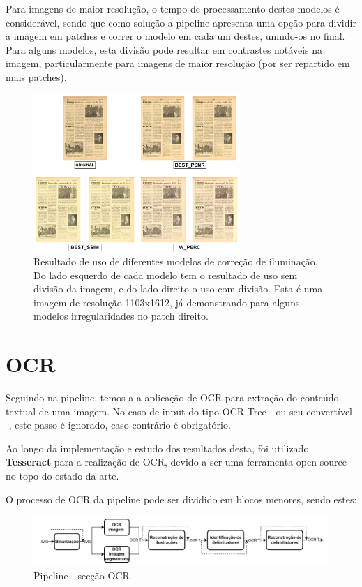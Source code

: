 Para imagens de maior resolução, o tempo de processamento destes modelos é considerável, sendo que como solução a pipeline apresenta uma opção para dividir a imagem em patches e correr o modelo em cada um destes, unindo-os no final. Para alguns modelos, esta divisão pode resultar em contrastes notáveis na imagem, particularmente para imagens de maior resolução (por ser repartido em mais patches).

\begin{figure}[H]
	\centering
	\includegraphics[width=0.7\textwidth]{images/ilustracoes/fix_illumination_example.png}
	\caption{Resultado de uso de diferentes modelos de correção de iluminação. Do lado esquerdo de cada modelo tem o resultado de uso sem divisão da imagem, e do lado direito o uso com divisão. Esta é uma imagem de resolução 1103x1612, já demonstrando para alguns modelos irregularidades no patch direito.}
	\label{fig:fix_illumination_example}
\end{figure}


\section{OCR}


Seguindo na pipeline, temos a a aplicação de OCR para extração do conteúdo textual de uma imagem. No caso de input do tipo OCR Tree - ou seu convertível -, este passo é ignorado, caso contrário é obrigatório.


Ao longo da implementação e estudo dos resultados desta, foi utilizado \textbf{Tesseract} para a realização de OCR, devido a ser uma ferramenta open-source no topo do estado da arte.

O processo de OCR da pipeline pode ser dividido em blocos menores, sendo estes:

\begin{figure}[H]
	\centering
	\includegraphics[width=1\textwidth]{images/diagramas/arquitetura_pipeline_ocr.png}
	\caption{Pipeline - secção OCR}
	\label{fig:arquitetura_pipeline_ocr}
\end{figure}


